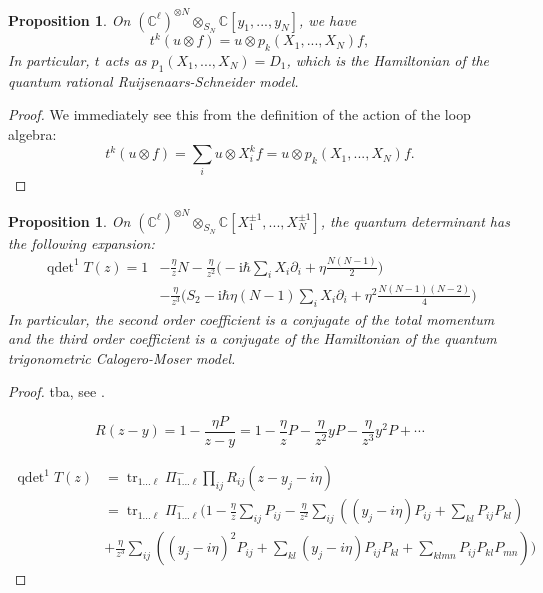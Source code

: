 \documentclass[11pt]{report}
\newtheorem{prop}[theorem]{Proposition}
\theoremstyle{definition}
\theoremstyle{remark}
\theoremstyle{remark}
\newcommand{\C}{\mathbb{C}}
\newcommand{\I}{\mathrm{i}}
\begin{document}
\begin{prop}
On $(\C^\ell)^{\otimes N} \otimes_{S_N} \C[y_1,...,y_N]$, we have
\begin{equation*}
t^k(u \otimes f) = u \otimes p_k(X_1,...,X_N) f,
\end{equation*}
In particular, $t$ acts as $p_1(X_1,...,X_N) = D_1$, which is the Hamiltonian of the quantum rational Ruijsenaars-Schneider model.
\end{prop}

\begin{proof}
We immediately see this from the definition of the action of the loop algebra:
\begin{equation*}
t^k(u \otimes f) = \sum_i u \otimes X_i^k f = u \otimes p_k(X_1,...,X_N) f.
\end{equation*}
\end{proof}

\begin{prop}
On $(\C^\ell)^{\otimes N} \otimes_{S_N} \C[X_1^{\pm 1},...,X_N^{\pm 1}]$, the quantum determinant has the following expansion:
\begin{align*}
\operatorname{qdet}^1 T(z)
= 1 &- \frac{\eta}{z} N - \frac{\eta}{z^2} \bigg( -\I \hbar \sum_i X_i \partial_i + \eta \frac{N(N-1)}{2} \bigg) \\
&- \frac{\eta}{z^3} \bigg( S_2 - \I \hbar \eta (N-1) \sum_i X_i \partial_i + \eta^2 \frac{N(N-1)(N-2)}{4} \bigg)
\end{align*}
In particular, the second order coefficient is a conjugate of the total momentum and the third order coefficient is a conjugate of the Hamiltonian of the quantum trigonometric Calogero-Moser model.
\end{prop}

\begin{proof}
tba, see \cite{article:bernard:1993}.

\begin{equation*}
R(z-y) = 1 - \frac{\eta P}{z-y} = 1 - \frac{\eta}{z} P - \frac{\eta}{z^2} y P - \frac{\eta}{z^3} y^2 P + \cdots
\end{equation*}

\begin{align*}
\operatorname{qdet}^1 T(z)
&= \operatorname{tr}_{1...\ell} \Pi_{1...\ell}^- \prod_{ij} R_{ij}(z-y_j-i\eta) \\
&= \operatorname{tr}_{1...\ell} \Pi_{1...\ell}^- ( 1
- \frac{\eta}{z} \sum_{ij} P_{ij}
- \frac{\eta}{z^2} \sum_{ij} \left( (y_j-i\eta) P_{ij} + \sum_{kl} P_{ij} P_{kl} \right) \\
&+ \frac{\eta}{z^3} \sum_{ij} \left( (y_j-i\eta)^2 P_{ij} + \sum_{kl} (y_j-i\eta) P_{ij} P_{kl} + \sum_{klmn} P_{ij} P_{kl} P_{mn} \right) )
\end{align*}
\end{proof}
\end{document}
